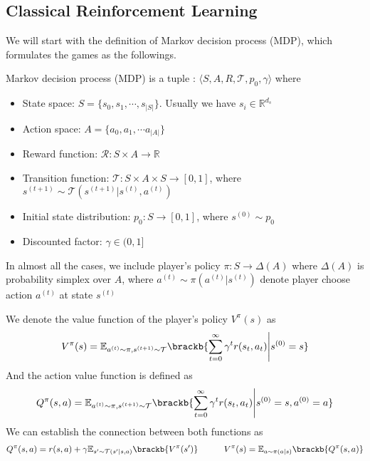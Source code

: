 \subsection{Classical Reinforcement Learning}
We will start with the definition of Markov decision process (MDP), which formulates the games as the followings.
\begin{definition}
    Markov decision process (MDP) is a tuple : $\langle S, A, R, \mathcal{T}, p_0, \gamma \rangle$ where 
    \begin{itemize}
        \item State space: $S = \{s_0, s_1, \cdots , s_{|S|}\}$. Usually we have $s_i \in \mathbb{R}^{d_s}$
        \item Action space: $A = \{a_0, a_1, \cdots a_{|A|}\}$
        \item Reward function: $\mathcal{R}: S \times A \rightarrow \mathbb{R}$
        \item Transition function: $\mathcal{T}: S \times A \times S \rightarrow [0, 1]$, where $s^{(t+1)} \sim \mathcal{T}(s^{(t+1)} | s^{(t)}, a^{(t)})$ 
        \item Initial state distribution: $p_0 : S \rightarrow [0, 1] $, where $s^{(0)} \sim p_0$
        \item Discounted factor: $\gamma \in (0, 1]$
    \end{itemize}
    In almost all the cases, we include player's policy $\pi: S \rightarrow \Delta(A)$ where $\Delta(A)$ is probability simplex over $A$, where $a^{(t)} \sim \pi(a^{(t)} | s^{(t)})$ denote player choose action $a^{(t)}$ at state $s^{(t)}$
\end{definition}
\noindent
We denote the value function of the player's policy $V^\pi(s)$ as 
\begin{equation}
    V^\pi(s) = \mathbb{E}_{a^{(t)} \sim \pi, s^{(t+1)}\sim \mathcal{T}}\brackb{\sum^\infty_{t=0} \gamma^t r(s_t, a_t) \Bigg| s^{(0)} = s}
\end{equation}
And the action value function is defined as 
\begin{equation}
    Q^\pi(s, a) = \mathbb{E}_{a^{(t)} \sim \pi, s^{(t+1)}\sim \mathcal{T}}\brackb{\sum^\infty_{t=0} \gamma^t r(s_t, a_t) \Bigg| s^{(0)} = s, a^{(0)} = a}
\end{equation}
We can establish the connection between both functions as
\begin{equation}
    \label{eqn:Q-and-V}
    Q^\pi(s, a) = r(s, a) + \gamma \mathbb{E}_{s' \sim \mathcal{T}(s' | s, a)}\brackb{V^\pi(s')} \quad \quad \quad V^\pi(s) = \mathbb{E}_{a \sim \pi(a | s)} \brackb{Q^\pi(s, a)}
\end{equation}
